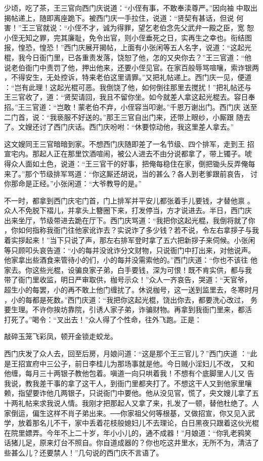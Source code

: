 少顷，吃了茶，王三官向西门庆说道：“小侄有事，不敢奉渎尊严。”因向袖
中取出揭帖递上，随即离座跪下。被西门庆一手拉住，说道：“贤契有甚话，但说
何害！”王三官就说：“小侄不才，诚为得罪，望乞老伯念先父武弁一殿之臣，宽
恕小侄无知之罪，完其廉耻，免令出官，则小侄垂死之日，实再生之幸也。衔结图
报，惶恐，惶恐！”西门庆展开揭帖，上面有小张闲等五人名字，说道：“这起光
棍，我今日衙门里，已各重责发落，饶恕了他，怎的又央你去？”王三官道：“他
说老伯衙门中责罚了他，押出他来，还要小侄见官。在家百般辱骂喧嚷，索诈银两
，不得安生，无处控诉，特来老伯这里请罪。”又把礼帖递上。西门庆一见，便道
：“岂有此理！这起光棍可恶。我倒饶了他，如何倒往那里去搅扰！”把礼帖还与
王三官收了，道：“贤契请回，我且不留你坐。如今就差人拿这起光棍去。容日奉
招。”王三官道：“岂敢！蒙老伯不弃，小侄容当叩谢。”千恩万谢出门。西门庆
送至二门首，说：“我亵服不好送的。”那王三官自出门来，还带上眼纱，小厮跟
随去了。文嫂还讨了西门庆话。西门庆吩咐：“休要惊动他，我这里差人拿去。”

这文嫂同王三官暗暗到家。不想西门庆随即差了一名节级、四个排军，走到王
招宣宅内。那起人正在那里饮酒喧闹，被公人进去不由分说都拿了，带上镯子。唬
得众人面如土色，说道：“王三官干的好事，把俺每稳住在家，倒把锄头反弄俺每
来了。”那个节级排军骂道：“你这厮还胡说，当的甚么？各人到老爹跟前哀告，
讨你那命是正经。”小张闲道：“大爷教导的是。”

不一时，都拿到西门庆宅门首，门上排军并平安儿都张着手儿要钱，才替他禀
。众人不免脱下褶儿，并拿头上簪圈下来，打发停当，方才说进去。半日，西门庆
出来坐厅，节级带进去跪在厅下。西门庆骂道：“我把你这起光棍，我倒将就了你
，你如何指称我衙门往他家讹诈去？实说诈了多少钱？若不说，令左右拿拶子与我
着实拶起来！”当下只说了声，那左右排军登时拿了五六把新拶子来伺候。小张闲
等只顾叩头哀告道：“小的每并没讹诈分文财物，只说衙门中打出来，对他说声。
他家拿出些酒食来管待小的们，小的每并没需索他的。”西门庆道：“你也不该往
他家去。你这些光棍，设骗良家子弟，白手要钱，深为可恨！既不肯实供，都与我
带了衙门里收监，明日严审取供，枷号示众！”众人一齐哀告，哭道：“天官爷，
超生小的每罢，小的再不敢上他门缠扰了。休说枷号，这一送到监里去，冬寒时月
，小的每都是死数。”西门庆道：“我把你这起光棍，饶出你去，都要洗心改过，
务要生理。不许你挨坊靠院，引诱人家子弟，诈骗财物。再拿到我衙门里来，都活
打死了。”喝令：“叉出去！”众人得了个性命，往外飞跑。正是：

敲碎玉笼飞彩凤，顿开金锁走蛟龙。

西门庆发了众人去，回至后房，月娘问道：“这是那个王三官儿？”西门庆道
：“此是王招宣府中三公子，前日李桂儿为那场事就是他。今日贼小淫妇儿不改，
又和他缠，每月三十两银子教他包着。嗔道一向只哄着我！不想有个底脚里人儿又
告我说，教我差干事的拿了这干人，到衙门里都夹打了。不想这干人又到他家里嚷
赖，指望要诈他几两银子，只说衙门中要他。他从没见官，慌了，央文嫂儿拿了五
十两礼帖来求我说人情。我刚才把那起人又拿了来，扎发了一顿，替他杜绝了。人
家倒运，偏生这样不肖子弟出来。──你家祖父何等根基，又做招宣，你又见入武
学，放着那名儿不干，家中丢着花枝般媳妇儿不去理论，白日黑夜只跟着这伙光棍
在院里嫖弄。今年不上二十岁，年小小儿的，通不成器！”月娘道：“你乳老鸦笑
话猪儿足，原来灯台不照自。你自道成器的？你也吃这井里水，无所不为，清洁了
些甚么儿？还要禁人！”几句说的西门庆不言语了。

